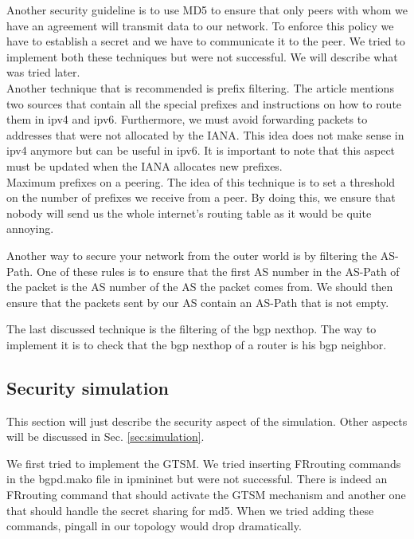 \documentclass[letter, 9pt, conference]{ieeeconf}
\begin{document}
Another security guideline is to use MD5 to ensure that only peers with whom we have an agreement will transmit data to our network. To enforce this policy we have to establish a secret and we have to communicate it to the peer. We tried to implement both these techniques but were not successful. We will describe what was tried later. \\

Another technique that is recommended is prefix filtering. The article mentions two sources that contain all the special prefixes and instructions on how to route them in ipv4 and ipv6. Furthermore, we must avoid forwarding packets to addresses that were not allocated by the IANA. This idea does not make sense in ipv4 anymore but can be useful in ipv6. It is important to note that this aspect must be updated when the IANA allocates new prefixes. \\

Maximum prefixes on a peering. The idea of this technique is to set a threshold on the number of prefixes we receive from a peer. By doing this, we ensure that nobody will send us the whole internet's routing table as it would be quite annoying. 

Another way to secure your network from the outer world is by filtering the AS-Path. One of these rules is to ensure that the first AS number in the AS-Path of the packet is the AS number of the AS the packet comes from. We should then ensure that the packets sent by our AS contain an AS-Path that is not empty. 

The last discussed technique is the filtering of the bgp nexthop. The way to implement it is to check that the bgp nexthop of a router is his bgp neighbor.

\subsection{Security simulation}
\label{sec:security}

This section will just describe the security aspect of the simulation. Other aspects will be discussed in Sec. \ref{sec:simulation}. 

We first tried to implement the GTSM. We tried inserting FRrouting commands in the bgpd.mako file in ipmininet but were not successful. There is indeed an FRrouting command that should activate the GTSM mechanism and another one that should handle the secret sharing for md5. When we tried adding these commands, pingall in our topology would drop dramatically.     
\end{document}
